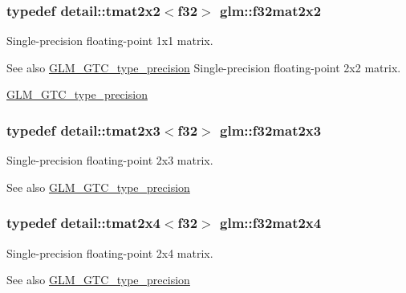 \subsubsection[{f32mat2x2}]{\setlength{\rightskip}{0pt plus 5cm}typedef detail\+::tmat2x2$<$f32$>$ {\bf glm\+::f32mat2x2}}\label{group__gtc__type__precision_ga0cd7f055e4070140afba92b7fbff1e04}
Single-\/precision floating-\/point 1x1 matrix. \begin{DoxySeeAlso}{See also}
\hyperlink{group__gtc__type__precision}{G\+L\+M\+\_\+\+G\+T\+C\+\_\+type\+\_\+precision} Single-\/precision floating-\/point 2x2 matrix. 

\hyperlink{group__gtc__type__precision}{G\+L\+M\+\_\+\+G\+T\+C\+\_\+type\+\_\+precision} 
\end{DoxySeeAlso}
\hypertarget{group__gtc__type__precision_gae5592c8cdb8c7d7985d06af7d774e261}{}
\subsubsection[{f32mat2x3}]{\setlength{\rightskip}{0pt plus 5cm}typedef detail\+::tmat2x3$<$f32$>$ {\bf glm\+::f32mat2x3}}\label{group__gtc__type__precision_gae5592c8cdb8c7d7985d06af7d774e261}
Single-\/precision floating-\/point 2x3 matrix. \begin{DoxySeeAlso}{See also}
\hyperlink{group__gtc__type__precision}{G\+L\+M\+\_\+\+G\+T\+C\+\_\+type\+\_\+precision} 
\end{DoxySeeAlso}
\hypertarget{group__gtc__type__precision_gaf86a2c845d7ced1b3c0c22a0b5b7e3e8}{}
\subsubsection[{f32mat2x4}]{\setlength{\rightskip}{0pt plus 5cm}typedef detail\+::tmat2x4$<$f32$>$ {\bf glm\+::f32mat2x4}}\label{group__gtc__type__precision_gaf86a2c845d7ced1b3c0c22a0b5b7e3e8}
Single-\/precision floating-\/point 2x4 matrix. \begin{DoxySeeAlso}{See also}
\hyperlink{group__gtc__type__precision}{G\+L\+M\+\_\+\+G\+T\+C\+\_\+type\+\_\+precision} 
\end{DoxySeeAlso}
\hypertarget{group__gtc__type__precision_gadc036a0da6d6b14996ece8884896a0e6}{}
